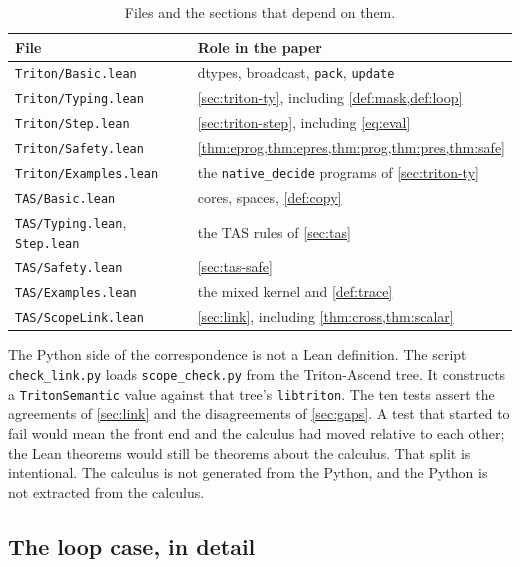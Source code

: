 \documentclass[a4paper,UKenglish,anonymous,cleveref,autoref]{lipics-v2021}
\begin{document}
\begin{table}[t]
\caption{Files and the sections that depend on them.}
\label{tab:files}
\begin{tabular}{@{}ll@{}}
\hline
File & Role in the paper \\
\hline
\texttt{Triton/Basic.lean} & dtypes, broadcast, \texttt{pack}, \texttt{update} \\
\texttt{Triton/Typing.lean} & \cref{sec:triton-ty}, including \cref{def:mask,def:loop} \\
\texttt{Triton/Step.lean} & \cref{sec:triton-step}, including \cref{eq:eval} \\
\texttt{Triton/Safety.lean} & \cref{thm:eprog,thm:epres,thm:prog,thm:pres,thm:safe} \\
\texttt{Triton/Examples.lean} & the \texttt{native\_decide} programs of \cref{sec:triton-ty} \\
\texttt{TAS/Basic.lean} & cores, spaces, \cref{def:copy} \\
\texttt{TAS/Typing.lean}, \texttt{Step.lean} & the TAS rules of \cref{sec:tas} \\
\texttt{TAS/Safety.lean} & \cref{sec:tas-safe} \\
\texttt{TAS/Examples.lean} & the mixed kernel and \cref{def:trace} \\
\texttt{TAS/ScopeLink.lean} & \cref{sec:link}, including \cref{thm:cross,thm:scalar} \\
\hline
\end{tabular}
\end{table}

The Python side of the correspondence is not a Lean definition.
The script \texttt{check\_link.py} loads \texttt{scope\_check.py} from the Triton-Ascend tree.
It constructs a \texttt{TritonSemantic} value against that tree's \texttt{libtriton}.
The ten tests assert the agreements of \cref{sec:link} and the disagreements of \cref{sec:gaps}.
A test that started to fail would mean the front end and the calculus had moved relative to each other; the Lean theorems would still be theorems about the calculus.
That split is intentional.
The calculus is not generated from the Python, and the Python is not extracted from the calculus.

\subsection{The loop case, in detail}
\label{sec:loop-case}
\end{document}
